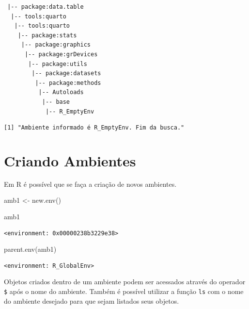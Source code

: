\documentclass[
  letterpaper,
  DIV=11,
  numbers=noendperiod]{scrreprt}
\newenvironment{Shaded}{\begin{snugshade}}{\end{snugshade}}
\newcommand{\CommentTok}[1]{\textcolor[rgb]{0.37,0.37,0.37}{#1}}
\newcommand{\DecValTok}[1]{\textcolor[rgb]{0.68,0.00,0.00}{#1}}
\newcommand{\FunctionTok}[1]{\textcolor[rgb]{0.28,0.35,0.67}{#1}}
\newcommand{\NormalTok}[1]{\textcolor[rgb]{0.00,0.23,0.31}{#1}}
\newcommand{\OtherTok}[1]{\textcolor[rgb]{0.00,0.23,0.31}{#1}}
\newcommand{\SpecialCharTok}[1]{\textcolor[rgb]{0.37,0.37,0.37}{#1}}
\begin{document}
\begin{verbatim}
 |-- package:data.table
  |-- tools:quarto
   |-- tools:quarto
    |-- package:stats
     |-- package:graphics
      |-- package:grDevices
       |-- package:utils
        |-- package:datasets
         |-- package:methods
          |-- Autoloads
           |-- base
            |-- R_EmptyEnv
\end{verbatim}

\begin{verbatim}
[1] "Ambiente informado é R_EmptyEnv. Fim da busca."
\end{verbatim}

\hypertarget{criando-ambientes}{%
\section{Criando Ambientes}\label{criando-ambientes}}

Em R é possível que se faça a criação de novos ambientes.

\begin{Shaded}
\begin{Highlighting}[]
\NormalTok{amb1 }\OtherTok{\textless{}{-}} \FunctionTok{new.env}\NormalTok{()}

\NormalTok{amb1}
\end{Highlighting}
\end{Shaded}

\begin{verbatim}
<environment: 0x00000238b3229e38>
\end{verbatim}

\begin{Shaded}
\begin{Highlighting}[]
\FunctionTok{parent.env}\NormalTok{(amb1)}
\end{Highlighting}
\end{Shaded}

\begin{verbatim}
<environment: R_GlobalEnv>
\end{verbatim}

Objetos criados dentro de um ambiente podem ser acessados através do
operador \texttt{\$} após o nome do ambiente. Também é possível utilizar
a função \texttt{ls} com o nome do ambiente desejado para que sejam
listados seus objetos.

\begin{Shaded}
\end{Shaded}
\end{document}

